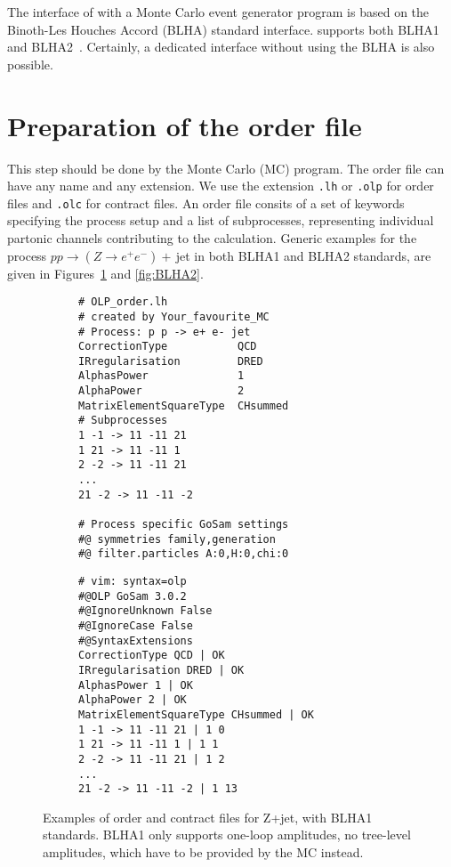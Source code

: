 The interface of \gosam with a Monte Carlo event generator program is based on the Binoth-Les Houches Accord (BLHA) standard interface. \gosamv  supports both BLHA1~\cite{Binoth:2010xt} and BLHA2~\cite{Alioli:2013nda}. Certainly, a dedicated interface without using the BLHA is also possible.

%
%
%
%

\section{Preparation of the order file}
This step should be done by the Monte Carlo (MC) program. The order file can have any name and any extension. We use  the extension \texttt{.lh} or \texttt{.olp} for order files and \texttt{.olc} for contract files. An order file consits of a set of keywords specifying the process setup and a list of subprocesses, representing individual partonic channels contributing to the calculation. Generic examples for the process $pp\to (Z\to e^+e^-)+$\,jet in both BLHA1 and BLHA2 standards, are given in Figures~\ref{fig:BLHA1} and \ref{fig:BLHA2}.

\begin{figure}
\centering
\begin{subfigure}[]{0.49\textwidth}
\centering
\begin{lstlisting}[title={BLHA1 order file},gobble=0,style=insmall,keepspaces=true,frame=single]
# OLP_order.lh
# created by Your_favourite_MC
# Process: p p -> e+ e- jet
CorrectionType           QCD
IRregularisation         DRED
AlphasPower              1
AlphaPower               2
MatrixElementSquareType  CHsummed
# Subprocesses
1 -1 -> 11 -11 21
1 21 -> 11 -11 1
2 -2 -> 11 -11 21
...
21 -2 -> 11 -11 -2

# Process specific GoSam settings
#@ symmetries family,generation
#@ filter.particles A:0,H:0,chi:0
\end{lstlisting}
\end{subfigure}
\hspace*{5pt}
\begin{subfigure}[]{0.46\textwidth}
\centering
\begin{lstlisting}[title={BLHA1 contract file},gobble=0,style=insmall,keepspaces=true,frame=single]
# vim: syntax=olp
#@OLP GoSam 3.0.2
#@IgnoreUnknown False
#@IgnoreCase False
#@SyntaxExtensions
CorrectionType QCD | OK
IRregularisation DRED | OK
AlphasPower 1 | OK
AlphaPower 2 | OK
MatrixElementSquareType CHsummed | OK
1 -1 -> 11 -11 21 | 1 0
1 21 -> 11 -11 1 | 1 1
2 -2 -> 11 -11 21 | 1 2
...
21 -2 -> 11 -11 -2 | 1 13
\end{lstlisting}
\end{subfigure}
\caption{Examples of order and contract files for Z+jet, with BLHA1 standards. BLHA1 only supports one-loop amplitudes, no tree-level amplitudes, which have to be provided by the MC instead.}
\label{fig:BLHA1}
\end{figure}  

